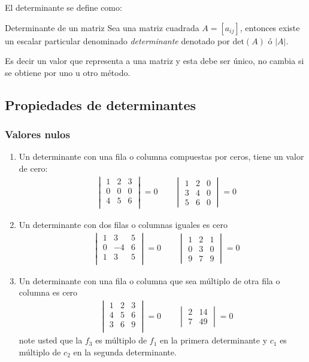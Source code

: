 El determinante se define como:
\begin{Theorem*} {Determinante de un matriz}
	Sea una matriz cuadrada $ A=[ a_{ij} ] $, entonces existe un escalar particular denominado \textit{determinante} denotado por $\mathrm{det}(A)$ ó $|A|$.
\end{Theorem*}
Es decir un valor que representa a una matriz y esta debe ser único, no cambia si se obtiene por uno u otro método.
\subsection{Propiedades de determinantes}
\subsubsection*{Valores nulos}
\begin{enumerate}
	\item Un determinante con una fila o columna compuestas por ceros, tiene un valor de cero:
	\begin{align*}
		&\begin{vmatrix}
			1&2&3\\
			0&0&0\\
			4&5&6\\
		\end{vmatrix}=0\quad\quad\begin{vmatrix}
			1&2&0\\
			3&4&0\\
			5&6&0
		\end{vmatrix}=0
	\end{align*}
	\item Un determinante con dos filas o columnas iguales es cero
	\begin{align*}
		&\begin{vmatrix}
			1&3&5\\
			0&-4&6\\
			1&3&5\\
		\end{vmatrix}=0\quad\quad\begin{vmatrix}
			1&2&1\\
			0&3&0\\
			9&7&9
		\end{vmatrix}=0
	\end{align*}
	\item Un determinante con una fila o columna que sea múltiplo de otra fila o columna es cero
	\begin{align*}
		&\begin{vmatrix}
			1&2&3\\
			4&5&6\\
			3&6&9\\
		\end{vmatrix}=0\quad\quad\begin{vmatrix}
			2&14\\
			7&49
		\end{vmatrix}=0
	\end{align*}
	note usted que la $f_3$ es múltiplo de $f_1$ en la primera determinante y $c_1$ es múltiplo de $c_2$ en la segunda determinante.
\end{enumerate}
